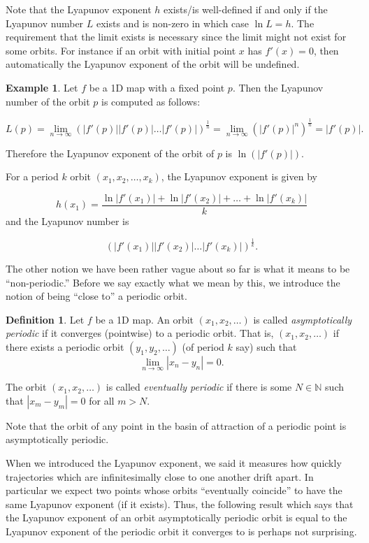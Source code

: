 \documentclass[
  a4paper,
  oneside,
  final]{krantz}
\newcommand{\N}{\mathbb{N}}
\theoremstyle{definition}
\newtheorem{definition}{Definition}[chapter]
\theoremstyle{definition}
\newtheorem{example}{Example}[chapter]
\theoremstyle{definition}
\theoremstyle{definition}
\theoremstyle{remark}
\begin{document}
Note that the Lyapunov exponent \(h\) exists/is well-defined if and only if the Lyapunov number \(L\) exists and is non-zero in which case \(\ln L = h\). The requirement that the limit exists is necessary since the limit might not exist for some orbits. For instance if an orbit with initial point \(x\) has \(f'(x) = 0\), then automatically the Lyapunov exponent of the orbit will be undefined.

\begin{example}

Let \(f\) be a 1D map with a fixed point \(p\). Then the Lyapunov number of the orbit \(p\) is computed as follows:

\[ L(p) = \lim_{n \to \infty} (|f'(p)||f'(p)| \ldots |f'(p)|)^{\frac{1}{n}}  = \lim_{n \to \infty} (|f'(p)|^n)^{\frac{1}{n}} = |f'(p)|.\]

Therefore the Lyapunov exponent of the orbit of \(p\) is \(\ln(|f'(p)|)\).

For a period \(k\) orbit \((x_1, x_2, \ldots, x_{k})\), the Lyapunov exponent is given by

\[h(x_1) = \dfrac{\ln|f'(x_1)| + \ln|f'(x_2)|+ \ldots + \ln|f'(x_k)|}{k}\] and the Lyapunov number is

\[(|f'(x_1)| |f'(x_2)|\ldots |f'(x_k)|)^{\frac{1}{k}}.\]
\end{example}

The other notion we have been rather vague about so far is what it means to be ``non-periodic.'' Before we say exactly what we mean by this, we introduce the notion of being ``close to'' a periodic orbit.

\begin{definition}
\protect\hypertarget{def:asymptoticallyperiodic}{}\label{def:asymptoticallyperiodic}Let \(f\) be a 1D map. An orbit \((x_1, x_2, \ldots)\) is called \emph{asymptotically periodic} if it converges (pointwise) to a periodic orbit. That is, \((x_1, x_2, \ldots)\) if there exists a periodic orbit \((y_1, y_2, \ldots)\) (of period \(k\) say) such that
\[ \lim_{n\to \infty} |x_n - y_n| = 0. \]

The orbit \((x_1, x_2, \ldots)\) is called \emph{eventually periodic} if there is some \(N \in \N\) such that \(|x_m - y_m| = 0\) for all \(m> N\).
\end{definition}

Note that the orbit of any point in the basin of attraction of a periodic point is asymptotically periodic.

When we introduced the Lyapunov exponent, we said it measures how quickly trajectories which are infinitesimally close to one another drift apart. In particular we expect two points whose orbits ``eventually coincide'' to have the same Lyapunov exponent (if it exists). Thus, the following result which says that the Lyapunov exponent of an orbit asymptotically periodic orbit is equal to the Lyapunov exponent of the periodic orbit it converges to is perhaps not surprising.
\end{document}
